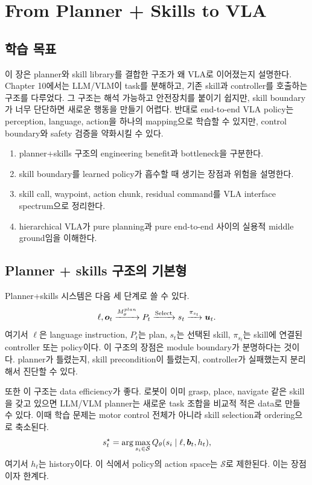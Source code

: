 \chapter{From Planner + Skills to VLA}

\section*{학습 목표}

이 장은 planner와 skill library를 결합한 구조가 왜 VLA로 이어졌는지 설명한다. Chapter 10에서는 LLM/VLM이 task를 분해하고, 기존 skill과 controller를 호출하는 구조를 다루었다. 그 구조는 해석 가능하고 안전장치를 붙이기 쉽지만, skill boundary가 너무 단단하면 새로운 행동을 만들기 어렵다. 반대로 end-to-end VLA policy는 perception, language, action을 하나의 mapping으로 학습할 수 있지만, control boundary와 safety 검증을 약화시킬 수 있다.

\begin{enumerate}
  \item planner+skills 구조의 engineering benefit과 bottleneck을 구분한다.
  \item skill boundary를 learned policy가 흡수할 때 생기는 장점과 위험을 설명한다.
  \item skill call, waypoint, action chunk, residual command를 VLA interface spectrum으로 정리한다.
  \item hierarchical VLA가 pure planning과 pure end-to-end 사이의 실용적 middle ground임을 이해한다.
\end{enumerate}

\section{Planner + skills 구조의 기본형}

Planner+skills 시스템은 다음 세 단계로 쓸 수 있다.
\begin{equation}
  \ell,\bm{o}_t
  \xrightarrow{M_{\theta}^{plan}}
  P_t
  \xrightarrow{\mathrm{Select}}
  s_t
  \xrightarrow{\pi_{s_t}}
  \bm{u}_t.
  \label{eq:planner-skill-basic}
\end{equation}
여기서 $\ell$은 language instruction, $P_t$는 plan, $s_t$는 선택된 skill, $\pi_{s_t}$는 skill에 연결된 controller 또는 policy이다. 이 구조의 장점은 module boundary가 분명하다는 것이다. planner가 틀렸는지, skill precondition이 틀렸는지, controller가 실패했는지 분리해서 진단할 수 있다.

또한 이 구조는 data efficiency가 좋다. 로봇이 이미 grasp, place, navigate 같은 skill을 갖고 있으면 LLM/VLM planner는 새로운 task 조합을 비교적 적은 data로 만들 수 있다. 이때 학습 문제는 motor control 전체가 아니라 skill selection과 ordering으로 축소된다.
\begin{equation}
  s_t^{\star}
  =
  \arg\max_{s_i\in\mathcal{S}}
  Q_{\theta}(s_i \mid \ell,\bm{b}_t,h_t),
  \label{eq:skill-selection-q}
\end{equation}
여기서 $h_t$는 history이다. 이 식에서 policy의 action space는 $\mathcal{S}$로 제한된다. 이는 장점이자 한계다.

